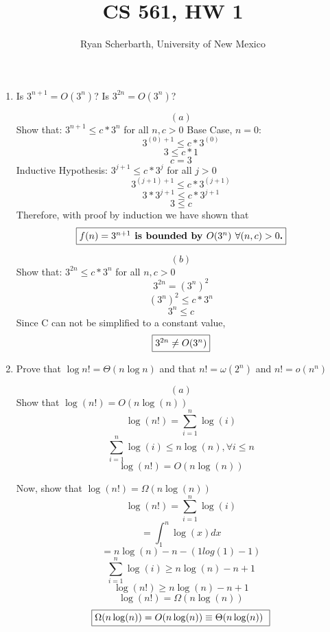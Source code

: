 \documentclass[11pt]{article}
\begin{document}
\title{CS 561, HW 1}

\author {Ryan Scherbarth, University of New Mexico}

\date{}
\maketitle


\begin{enumerate}

\item Is $3^{n+1} = O(3^{n})$?  Is $3^{2n} = O(3^n)$?

\[ (a) \]
Show that: $3^{n+1} \leq c * 3^n$ for all $n, c > 0$
\newline
Base Case, $n=0$: 
\newline 
\[ 3^{(0) + 1} \leq c * 3^{(0)} \]
\[ 3 \leq c * 1 \] 
\[ c = 3 \]
Inductive Hypothesis: $3^{j+1} \leq c * 3^{j}$ for all $j > 0$
\[ 3^{(j+1) + 1} \leq c * 3^{(j+1)} \]
\[ 3 * 3^{j+1} \leq c * 3^{j+1} \]
\[ 3 \leq c \]
Therefore, with proof by induction we have shown that
\[ \fbox{\textbf{$f(n) = 3^{n+1}$ is bounded by $O(3^{n})$ $\forall (n,c) > 0$.}} \]

\[ (b) \]
Show that: $3^{2n} \leq c * 3^{n}$ for all $n, c > 0$
\newline
\[ 3^{2n} = (3^n)^2 \]
\[ (3^n)^2  \leq c * 3^n \]
\[ 3^n  \leq c \]
Since C can not be simplified to a constant value, 
\[ \fbox{\textbf{$3^{2n} \neq O(3^n)$}} \]


\item Prove that $\log n! = \Theta(n \log n)$ and that $n! = \omega(2^{n})$ and $n! = o(n^{n})$

\[ (a) \]
Show that $\log(n!) = O(n\log(n))$  
\[ \log(n!) = \sum_{i=1}^{n}{\log(i)} \]
\[ \sum_{i=1}^{n}{\log(i)} \leq n \log(n) , \forall i \leq n \]
\[ \log(n!) = O(n\log(n)) \]

Now, show that $\log(n!) = \Omega(n\log(n))$
\[ \log(n!) = \sum_{i=1}^{n}{\log(i)} \]
\[  = \int^{n}_{1}\log(x)dx \]
\[  = n \log(n) - n - (1 log(1) - 1) \]
\[ \sum_{i=1}^{n}{\log(i)} \geq n \log(n) - n + 1 \]
\[ \log(n!) \geq n \log(n) - n + 1 \]
\[ \log(n!) = \Omega(n\log(n)) \]
\[ \fbox{\textbf{$\Omega(n \log(n)) = O(n \log(n)) \equiv \Theta(n \log(n) )$ }} \]



\end{enumerate}
\end{document}

